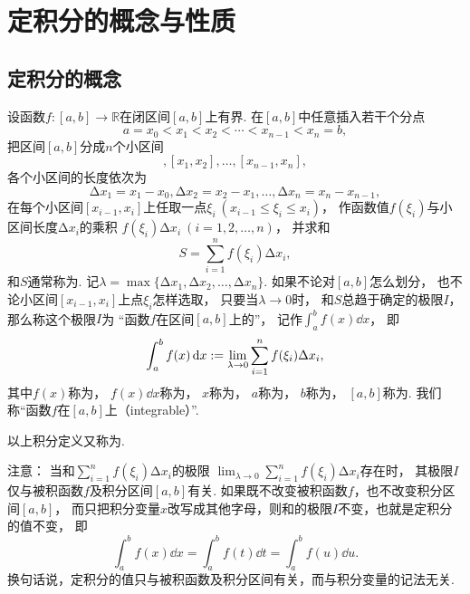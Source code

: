 \section{定积分的概念与性质}
\subsection{定积分的概念}
\begin{definition}
设函数\(f\colon[a,b]\to\mathbb{R}\)在闭区间\([a,b]\)上有界.
在\([a,b]\)中任意插入若干个分点\begin{equation*}
	a=x_0 < x_1 < x_2 < \dotsb < x_{n-1} < x_n = b,
\end{equation*}
把区间\([a,b]\)分成\(n\)个小区间\begin{equation*}
	[x_0,x_1],[x_1,x_2],\dotsc,[x_{n-1},x_n],
\end{equation*}
各个小区间的长度依次为\begin{equation*}
	\increment x_1=x_1-x_0,
	\increment x_2=x_2-x_1,
	\dotsc,
	\increment x_n=x_n-x_{n-1},
\end{equation*}
在每个小区间\([x_{i-1},x_i]\)上任取一点\(\xi_i\ (x_{i-1} \leq \xi_i \leq x_i)\)，
作函数值\(f(\xi_i)\)与小区间长度\(\increment x_i\)的乘积
\(f(\xi_i)\increment x_i\ (i=1,2,\dotsc,n)\)，
并求和\begin{equation*}
	S = \sum_{i=1}^n f(\xi_i) \increment x_i,
\end{equation*}
和\(S\)通常称为.
记\(\lambda=\max\{\increment x_1,\increment x_2,\dotsc,\increment x_n\}\).
如果不论对\([a,b]\)怎么划分，
也不论小区间\([x_{i-1},x_i]\)上点\(\xi_i\)怎样选取，
只要当\(\lambda\to0\)时，
和\(S\)总趋于确定的极限\(I\)，
那么称这个极限\(I\)为
“函数\(f\)在区间\([a,b]\)上的”，
记作\(\int_a^b f(x) \dd{x}\)，
即\begin{equation}
	\int_a^b f(x) \dd{x}
	:=
	\lim_{\lambda\to0} \sum_{i=1}^n f(\xi_i)\Delta x_i,
\end{equation}
其中\(f(x)\)称为，
\(f(x)\dd{x}\)称为，
\(x\)称为，
\(a\)称为，
\(b\)称为，
\([a,b]\)称为.
我们称“函数\(f\)在\([a,b]\)上（integrable）”.
\end{definition}
以上积分定义又称为.

注意：
当和\(\sum_{i=1}^n f(\xi_i) \increment x_i\)的极限
\(\lim_{\lambda\to0} \sum_{i=1}^n f(\xi_i) \increment x_i\)存在时，
其极限\(I\)仅与被积函数\(f\)及积分区间\([a,b]\)有关.
如果既不改变被积函数\(f\)，也不改变积分区间\([a,b]\)，
而只把积分变量\(x\)改写成其他字母，则和的极限\(I\)不变，也就是定积分的值不变，
即\begin{equation*}
	\int_a^b f(x) \dd{x}
	= \int_a^b f(t) \dd{t}
	= \int_a^b f(u) \dd{u}.
\end{equation*}
换句话说，定积分的值只与被积函数及积分区间有关，而与积分变量的记法无关.

